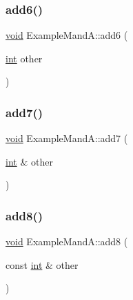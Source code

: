 \mbox{\label{class_example_mand_a_a5c61fa054534fc7594dfbd22804dc745}} 
\subsubsection{\texorpdfstring{add6()}{add6()}}
{\footnotesize\ttfamily \mbox{\hyperlink{_s_d_l__opengles2__gl2ext_8h_ae5d8fa23ad07c48bb609509eae494c95}{void}} Example\+Mand\+A\+::add6 (\begin{DoxyParamCaption}\item[{\mbox{\hyperlink{warnings_8h_a74f207b5aa4ba51c3a2ad59b219a423b}{int}}}]{other }\end{DoxyParamCaption})\hspace{0.3cm}{\ttfamily [inline]}}

\mbox{\label{class_example_mand_a_a6064204a45dd8814454414140b9ec201}} 
\subsubsection{\texorpdfstring{add7()}{add7()}}
{\footnotesize\ttfamily \mbox{\hyperlink{_s_d_l__opengles2__gl2ext_8h_ae5d8fa23ad07c48bb609509eae494c95}{void}} Example\+Mand\+A\+::add7 (\begin{DoxyParamCaption}\item[{\mbox{\hyperlink{warnings_8h_a74f207b5aa4ba51c3a2ad59b219a423b}{int}} \&}]{other }\end{DoxyParamCaption})\hspace{0.3cm}{\ttfamily [inline]}}

\mbox{\label{class_example_mand_a_a623bcc164293150c05aacf28cd7842a9}} 
\subsubsection{\texorpdfstring{add8()}{add8()}}
{\footnotesize\ttfamily \mbox{\hyperlink{_s_d_l__opengles2__gl2ext_8h_ae5d8fa23ad07c48bb609509eae494c95}{void}} Example\+Mand\+A\+::add8 (\begin{DoxyParamCaption}\item[{const \mbox{\hyperlink{warnings_8h_a74f207b5aa4ba51c3a2ad59b219a423b}{int}} \&}]{other }\end{DoxyParamCaption})\hspace{0.3cm}{\ttfamily [inline]}}


